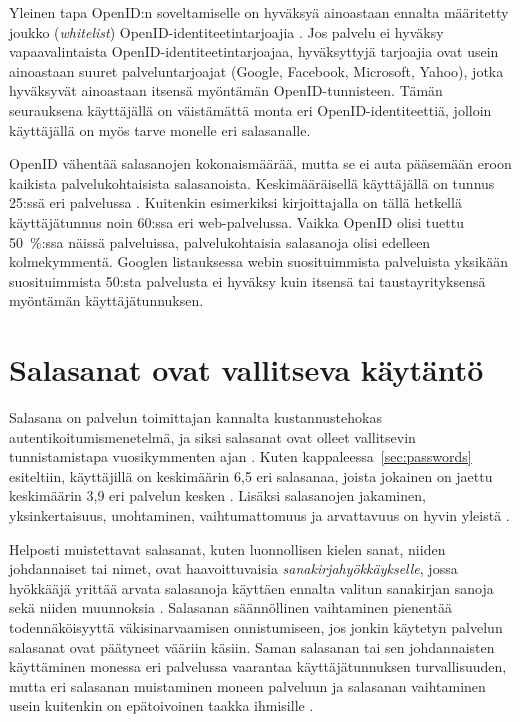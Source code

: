 \documentclass{tktltiki}
\begin{document}
Yleinen tapa OpenID:n soveltamiselle on hyväksyä ainoastaan ennalta määritetty joukko (\emph{whitelist})
OpenID-identiteetintarjoajia \cite{openid_seven_sites_mailinglist, openid_tech_or_movement}. 
Jos palvelu ei hyväksy vapaavalintaista OpenID-identiteetintarjoajaa, hyväksyttyjä tarjoajia ovat usein ainoastaan suuret palveluntarjoajat (Google, Facebook, Microsoft, Yahoo), jotka hyväksyvät ainoastaan itsensä
myöntämän OpenID-tunnisteen. Tämän seurauksena käyttäjällä on väistämättä monta eri OpenID-identiteettiä,
jolloin käyttäjällä on myös tarve monelle eri salasanalle.

OpenID vähentää salasanojen kokonaismäärää, mutta se ei auta pääsemään eroon kaikista palvelukohtaisista
salasanoista. Keskimääräisellä käyttäjällä on tunnus 25:ssä eri palvelussa \cite{study_of_passwords_07}.
Kuitenkin esimerkiksi kirjoittajalla on tällä hetkellä käyttäjätunnus noin 60:ssa eri web-palvelussa. Vaikka
OpenID olisi tuettu 50~\%:ssa näissä palveluissa, palvelukohtaisia salasanoja olisi edelleen kolmekymmentä.
Googlen listauksessa webin suosituimmista palveluista \cite{google_top1000_sites} yksikään suosituimmista 50:sta
palvelusta ei hyväksy kuin itsensä tai taustayrityksensä myöntämän käyttäjätunnuksen.



\section{Salasanat ovat vallitseva käytäntö}
  \label{sec:passwords_de_facto}

Salasana on palvelun toimittajan kannalta kustannustehokas autentikoitumismenetelmä, ja siksi salasanat ovat olleet vallitsevin tunnistamistapa vuosikymmenten ajan \cite{pw_auth_system_perspective_08}. Kuten kappaleessa~\ref{sec:passwords} esiteltiin, käyttäjillä on keskimäärin 6,5 eri salasanaa, joista jokainen on jaettu keskimäärin 3,9 eri palvelun kesken \cite{study_of_passwords_07}. Lisäksi salasanojen jakaminen, yksinkertaisuus, unohtaminen, vaihtumattomuus ja arvattavuus on hyvin yleistä \cite{password_management_strategies_06, pw_auth_system_perspective_08, passpet_06}.

Helposti muistettavat salasanat, kuten luonnollisen kielen sanat, niiden johdannaiset tai nimet, ovat haavoittuvaisia \emph{sanakirjahyökkäykselle}, jossa hyökkääjä yrittää arvata salasanoja käyttäen ennalta valitun sanakirjan sanoja sekä niiden muunnoksia \cite{users_are_not_the_enemy_99, passpet_06}. Salasanan säännöllinen vaihtaminen pienentää todennäköisyyttä väkisinarvaamisen onnistumiseen, jos jonkin käytetyn palvelun salasanat ovat päätyneet vääriin käsiin. Saman salasanan tai sen johdannaisten käyttäminen monessa eri palvelussa vaarantaa käyttäjätunnuksen turvallisuuden, mutta eri salasanan muistaminen moneen palveluun ja salasanan vaihtaminen usein kuitenkin on epätoivoinen taakka ihmisille \cite{password_management_strategies_06, passpet_06, pw_auth_system_perspective_08, users_are_not_the_enemy_99}.
\end{document}
